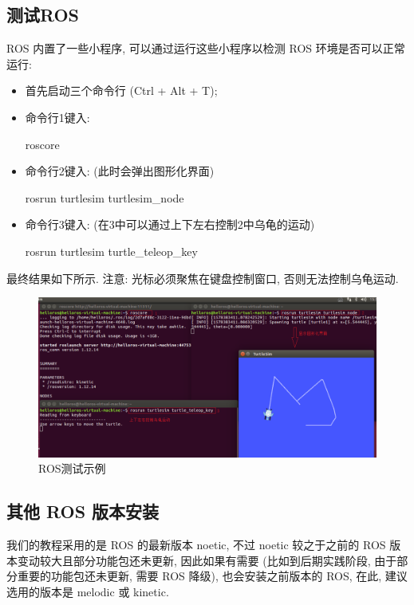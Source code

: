 \documentclass[openany, fontset=windowsold]{ctexbook}
\theoremstyle{kaiti}
\theoremstyle{normal}
\begin{document}
\subsection{测试ROS}

ROS 内置了一些小程序, 可以通过运行这些小程序以检测 ROS 环境是否可以正常运行:

\begin{itemize}
  \item 首先启动三个命令行 (Ctrl + Alt + T);

  \item 命令行1键入:
  \begin{bash}
    roscore
  \end{bash}

  \item 命令行2键入: (此时会弹出图形化界面)
  \begin{bash}
    rosrun turtlesim turtlesim_node
  \end{bash}

  \item 命令行3键入: (在3中可以通过上下左右控制2中乌龟的运动)
  \begin{bash}
    rosrun turtlesim turtle_teleop_key
  \end{bash}
\end{itemize}

最终结果如下所示. 注意: 光标必须聚焦在键盘控制窗口, 否则无法控制乌龟运动.

\begin{figure}[!ht]
  \centering
  \includegraphics[width=.9\textwidth]{ros_test_turtlesim.png}
  \caption{ROS测试示例}
  \label{fig:ros_test_turtlesim}
\end{figure}

\subsection{其他 ROS 版本安装}

我们的教程采用的是 ROS 的最新版本 noetic, 不过 noetic 较之于之前的 ROS 版本变动较大且部分功能包还未更新, 因此如果有需要 (比如到后期实践阶段, 由于部分重要的功能包还未更新, 需要 ROS 降级), 也会安装之前版本的 ROS, 在此, 建议选用的版本是 melodic 或 kinetic.
\end{document}
